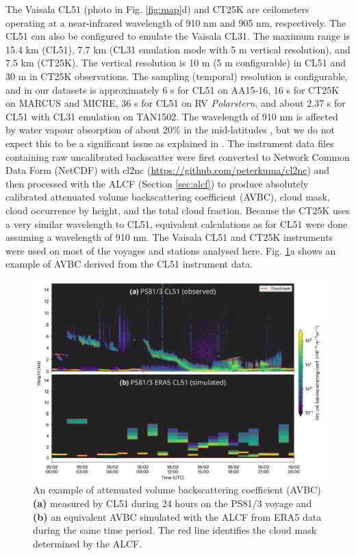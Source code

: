 \documentclass[12pt,a4paper]{article}
\begin{document}
The Vaisala CL51 (photo in Fig. \ref{fig:map}d) and CT25K are ceilometers
operating at a near-infrared wavelength of 910 nm and 905 nm, respectively.
The CL51 can also be configured to emulate the Vaisala CL31. The maximum range is
15.4 km (CL51), 7.7 km (CL31 emulation mode with 5 m vertical resolution), and
7.5 km (CT25K). The vertical resolution is 10 m (5 m configurable) in CL51 and
30 m in CT25K observations. The sampling (temporal) resolution is configurable, and in our
datasets is approximately 6 s for CL51 on AA15‐16, 16 s for CT25K on MARCUS and
MICRE, 36 s for CL51 on RV \emph{Polarstern}, and about 2.37 s for CL51 with
CL31 emulation on TAN1502. The wavelength of 910 nm is affected by water vapour
absorption of about 20\% in the mid-latitudes \citep{wiegner2015,wiegner2019},
but we do not expect this to be a significant issue as explained in
\cite{kuma2021}.  The instrument data files containing raw uncalibrated
backscatter were first converted to Network Common Data Form (NetCDF) with
cl2nc (\url{https://github.com/peterkuma/cl2nc}) and then processed with the
ALCF (Section \ref{sec:alcf}) to produce absolutely calibrated attenuated
volume backscattering coefficient (AVBC), cloud mask, cloud occurrence by
height, and the total cloud fraction. Because the CT25K uses a very similar
wavelength to CL51, equivalent calculations as for CL51 were done assuming a
wavelength of 910 nm. The Vaisala CL51 and CT25K instruments were used on most
of the voyages and stations analysed here. Fig.  \ref{fig:example}a shows an
example of AVBC derived from the CL51 instrument data.

\begin{figure}[b!]
\centering
\includegraphics[width=\textwidth]{img/example.png}
\caption{
An example of attenuated volume backscattering coefficient (AVBC) \textbf{(a)}
measured by CL51 during 24 hours on the PS81/3 voyage and \textbf{(b)} an
equivalent AVBC simulated with the ALCF from ERA5 data during the same time
period. The red line identifies the cloud mask determined by the ALCF.
}
\label{fig:example}
\end{figure}
\end{document}
